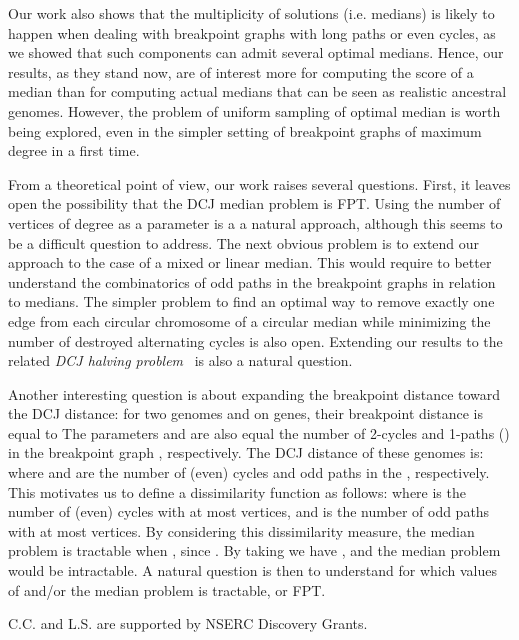 \documentclass[10pt]{llncs}
\begin{document}
Our work also shows that the multiplicity of solutions (i.e. medians)
is likely to happen when dealing with breakpoint graphs with long
paths or even cycles, as we showed that such components can admit
several optimal medians. Hence, our results, as they stand now, are of
interest more for computing the score of a median than for computing
actual medians that can be seen as realistic ancestral
genomes. However, the problem of uniform sampling of optimal median is
worth being explored, even in the simpler setting of breakpoint graphs
of maximum degree  in a first time.

From a theoretical point of view, our work raises several
questions. First, it leaves open the possibility that the DCJ median
problem is FPT. Using the number of vertices of degree  as a
parameter is a a natural approach, although this seems to be a
difficult question to address. The next obvious problem is to extend
our approach to the case of a mixed or linear median. This would
require to better understand the combinatorics of odd paths in the
breakpoint graphs in relation to medians. The simpler problem to find
an optimal way to remove exactly one edge from each circular
chromosome of a circular median while minimizing the number of
destroyed alternating cycles is also open. Extending our results to
the related \emph{DCJ halving problem}~\cite{Tannier2009} is also a
natural question.

Another interesting question is about expanding the breakpoint
distance toward the DCJ distance: for two genomes  and  on
 genes, their breakpoint distance is equal to
 The parameters  and  are also equal
the number of 2-cycles and 1-paths () in the breakpoint graph
, respectively.  The DCJ distance of these genomes is:
 where  and  are the number of
(even) cycles and odd paths in the , respectively. This
motivates us to define a dissimilarity function as follows:
 where  is the number of (even) cycles with at
most  vertices, and  is the number of odd paths
with at most  vertices.  By considering this dissimilarity
measure, the median problem is tractable when , since
. By taking  we have
, and the median problem would
be intractable. A natural question is then to understand for which
values of  and/or  the median problem is tractable, or FPT.

C.C. and L.S. are supported by NSERC Discovery Grants.
\end{document}
